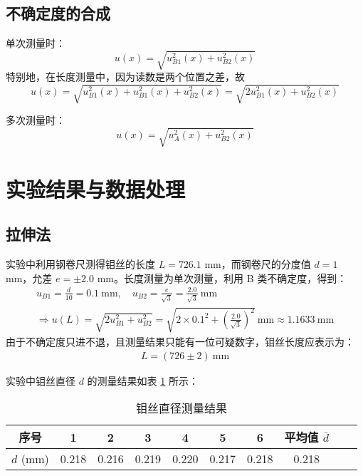 \documentclass[11pt]{article}
\begin{document}
	\subsection{不确定度的合成}
	
	
	单次测量时：
	\begin{equation*}
		u(x)=\sqrt{u_{B1}^2(x)+u^2_{B2}(x)} 
	\end{equation*}
	特别地，在长度测量中，因为读数是两个位置之差，故
	\begin{equation*}
		u(x)=\sqrt{u_{B1}^2(x)+u_{B1}^2(x)+u^2_{B2}(x)} =\sqrt{2u_{B1}^2(x)+u^2_{B2}(x)} 
	\end{equation*}
	
	多次测量时：
	\begin{equation*}
		u(x)=\sqrt{u_A^2(x)+u^2_{B2}(x)} 
	\end{equation*}
	
	\section{实验结果与数据处理}
	\subsection{拉伸法}
	实验中利用钢卷尺测得钼丝的长度 $L = 726.1$ mm，而钢卷尺的分度值 $d = 1$ mm，允差 $e = \pm 2.0$ mm。长度测量为单次测量，利用 B 类不确定度，得到：
	\begin{gather*}
		u_{B1} = \frac{d}{10} = 0.1 \ \mathrm{mm} ,\quad 
		u_{B2} = \frac{e}{\sqrt{3}} = \frac{2.0}{\sqrt{3}} \ \mathrm{mm} \\
		\Longrightarrow 
		u(L) = \sqrt{2u_{B1}^2 + u_{B2}^2} = \sqrt{2\times 0.1^2 + \left(\frac{2.0}{\sqrt{3}}\right)^2} \ \mathrm{mm} \approx 1.1633 \ \mathrm{mm}
	\end{gather*}
	由于不确定度只进不退，且测量结果只能有一位可疑数字，钼丝长度应表示为：
	\begin{gather*}
		L = (726 \pm 2) \ \mathrm{mm}
	\end{gather*}
	
	实验中钼丝直径 $d$ 的测量结果如表 \ref{钼丝直径测量结果} 所示：
	\begin{table}[H]\centering
		\caption{钼丝直径测量结果}
		\label{钼丝直径测量结果}
		\begin{tabular}{cccccccccc}\toprule
			序号 & 1 & 2 & 3 & 4 & 5 & 6 & 平均值 $\bar{d}$  \\
			\midrule
			$d$ (mm)  & 0.218 & 0.216 &	0.219 &	0.220 &	0.217 &	0.218 & 0.218  \\
			\bottomrule
		\end{tabular}
	\end{table}
	
\end{document}
